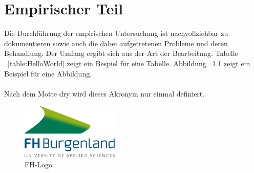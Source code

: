 \chapter{Empirischer Teil}
Die Durchführung der empirischen Untersuchung ist nachvollziehbar zu dokumentieren sowie auch die dabei aufgetretenen Probleme und deren Behandlung. Der Umfang ergibt sich aus der Art der Bearbeitung. Tabelle ~\ref{table:HelloWorld} zeigt ein Bespiel für eine Tabelle. Abbildung ~\ref{fig:fhLogo} zeigt ein Beispiel für eine Abbildung.
\\
\\Nach dem Motte \acrfull{dry} wird dieses Akronym nur einmal definiert.
\begin{figure}[H]
	\centering
	\includegraphics[height=100px]{images/FH-burgenland-logo.png}
	\caption{FH-Logo}
	\label{fig:fhLogo}
\end{figure}

